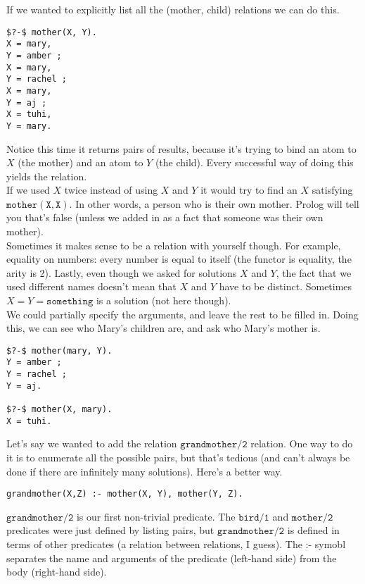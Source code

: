 \documentclass[a4paper,12pt]{article}
\newcommand{\kwa}[1]{\mathtt{#1}}
\begin{document}
\noindent
If we wanted to explicitly list all the (mother, child) relations we can do this.

\begin{lstlisting}
$?-$ mother(X, Y).
X = mary,
Y = amber ;
X = mary,
Y = rachel ;
X = mary,
Y = aj ;
X = tuhi,
Y = mary.
\end{lstlisting}

\noindent
Notice this time it returns pairs of results, because it's trying to bind an atom to $X$ (the mother) and an atom to $Y$ (the child). Every successful way of doing this yields the relation. \\

\noindent
If we used $X$ twice instead of using $X$ and $Y$ it would try to find an $X$ satisfying $\kwa{mother(X,X)}$. In other words, a person who is their own mother. Prolog will tell you that's false (unless we added in as a fact that someone was their own mother). \\

\noindent
Sometimes it makes sense to be a relation with yourself though. For example, equality on numbers: every number is equal to itself (the functor is equality, the arity is 2). Lastly, even though we asked for solutions $X$ and $Y$, the fact that we used different names doesn't mean that $X$ and $Y$ have to be distinct. Sometimes $X = Y = \kwa{something}$ is a solution (not here though).\\

\noindent
We could partially specify the arguments, and leave the rest to be filled in. Doing this, we can see who Mary's children are, and ask who Mary's mother is.

\begin{lstlisting}
$?-$ mother(mary, Y).
Y = amber ;
Y = rachel ;
Y = aj.

$?-$ mother(X, mary).
X = tuhi.
\end{lstlisting}

\noindent
Let's say we wanted to add the relation $\kwa{grandmother \slash 2}$ relation. One way to do it is to enumerate all the possible pairs, but that's tedious (and can't always be done if there are infinitely many solutions). Here's a better way.

\begin{lstlisting}
grandmother(X,Z) :- mother(X, Y), mother(Y, Z).
\end{lstlisting}

\noindent
$\kwa{grandmother \slash 2}$ is our first non-trivial predicate. The $\kwa{bird \slash 1}$ and $\kwa{mother \slash 2}$ predicates were just defined by listing pairs, but $\kwa{grandmother \slash 2}$ is defined in terms of other predicates (a relation between relations, I guess). The :- symobl separates the name and arguments of the predicate (left-hand side) from the body (right-hand side). \\
\end{document}
